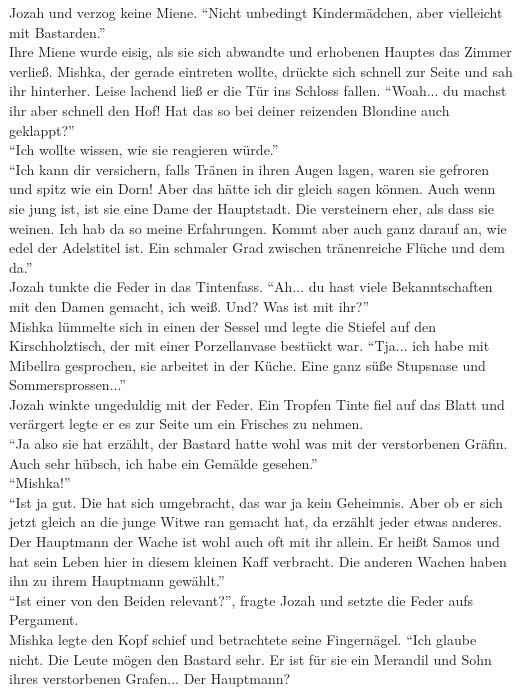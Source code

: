 Jozah und verzog keine Miene. ``Nicht unbedingt Kindermädchen, aber vielleicht mit Bastarden.''\\
Ihre Miene wurde eisig, als sie sich abwandte und erhobenen Hauptes das Zimmer verließ. Mishka, der 
gerade eintreten wollte, drückte sich schnell zur Seite und sah ihr hinterher. Leise lachend ließ 
er die Tür ins Schloss fallen. ``Woah... du machst ihr aber schnell den Hof! Hat das so bei deiner 
reizenden Blondine auch geklappt?''\\
``Ich wollte wissen, wie sie reagieren würde.''\\
``Ich kann dir versichern, falls Tränen in ihren Augen lagen, waren sie gefroren und spitz wie ein 
Dorn! Aber das hätte ich dir gleich sagen können. Auch wenn sie jung ist, ist sie eine Dame der 
Hauptstadt. Die versteinern eher, als dass sie weinen. Ich hab da so meine Erfahrungen. Kommt aber 
auch ganz darauf an, wie edel der Adelstitel ist. Ein schmaler Grad zwischen tränenreiche Flüche 
und dem da.''\\
Jozah tunkte die Feder in das Tintenfass. ``Ah... du hast viele Bekanntschaften mit den 
Damen gemacht, ich weiß. Und? Was ist mit ihr?''\\
Mishka lümmelte sich in einen der Sessel und legte die Stiefel auf den Kirschholztisch, der mit 
einer Porzellanvase bestückt war. ``Tja... ich habe mit Mibellra gesprochen, sie arbeitet in der 
Küche. Eine ganz süße Stupsnase und Sommersprossen...''\\
Jozah winkte ungeduldig mit der Feder. Ein Tropfen Tinte fiel auf das Blatt und verärgert legte er 
es zur Seite um ein Frisches zu nehmen.\\
``Ja also sie hat erzählt, der Bastard hatte wohl was mit der verstorbenen Gräfin. Auch sehr 
hübsch, ich habe ein Gemälde gesehen.''\\
``Mishka!''\\
``Ist ja gut. Die hat sich umgebracht, das war ja kein Geheimnis. Aber ob er sich jetzt gleich an 
die junge Witwe ran gemacht hat, da erzählt jeder etwas anderes. Der Hauptmann der Wache 
ist wohl auch oft mit ihr allein. Er heißt Samos und hat sein Leben hier in diesem kleinen 
Kaff verbracht. Die anderen Wachen haben ihn zu ihrem Hauptmann gewählt.''\\
``Ist einer von den Beiden relevant?'', fragte Jozah und setzte die Feder aufs Pergament.\\
Mishka legte den Kopf schief und betrachtete seine Fingernägel. ``Ich glaube nicht. Die Leute mögen 
den Bastard sehr. Er ist für sie ein Merandil und Sohn ihres verstorbenen Grafen... Der Hauptmann? 
